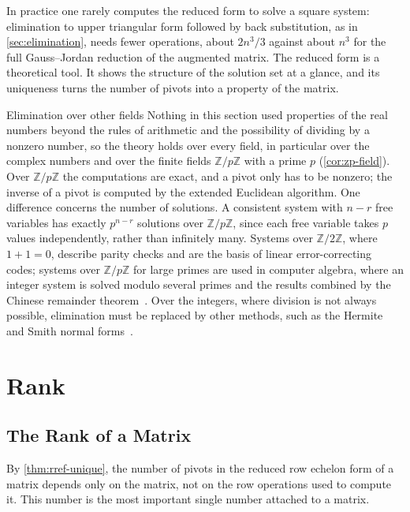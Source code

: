 In practice one rarely computes the reduced form to solve a square system: elimination to upper triangular form followed by back substitution, as in \cref{sec:elimination}, needs fewer operations, about $2n^3/3$ against about $n^3$ for the full Gauss--Jordan reduction of the augmented matrix. The reduced form is a theoretical tool. It shows the structure of the solution set at a glance, and its uniqueness turns the number of pivots into a property of the matrix.

\begin{note}{Elimination over other fields}
Nothing in this section used properties of the real numbers beyond the rules of arithmetic and the possibility of dividing by a nonzero number, so the theory holds over every field, in particular over the complex numbers and over the finite fields $\mathbb Z/p\mathbb Z$ with a prime $p$ (\cref{cor:zp-field}). Over $\mathbb Z/p\mathbb Z$ the computations are exact, and a pivot only has to be nonzero; the inverse of a pivot is computed by the extended Euclidean algorithm. One difference concerns the number of solutions. A consistent system with $n-r$ free variables has exactly $p^{n-r}$ solutions over $\mathbb Z/p\mathbb Z$, since each free variable takes $p$ values independently, rather than infinitely many. Systems over $\mathbb Z/2\mathbb Z$, where $1+1=0$, describe parity checks and are the basis of linear error-correcting codes; systems over $\mathbb Z/p\mathbb Z$ for large primes are used in computer algebra, where an integer system is solved modulo several primes and the results combined by the Chinese remainder theorem~\cite[Sect.~4.3.2]{knuth1997taocp2}. Over the integers, where division is not always possible, elimination must be replaced by other methods, such as the Hermite and Smith normal forms~\cite{cohen1993}.
\end{note}
\section{Rank}
\label{sec:rank}

\subsection{The Rank of a Matrix}

By \cref{thm:rref-unique}, the number of pivots in the reduced row echelon form of a matrix depends only on the matrix, not on the row operations used to compute it. This number is the most important single number attached to a matrix.

